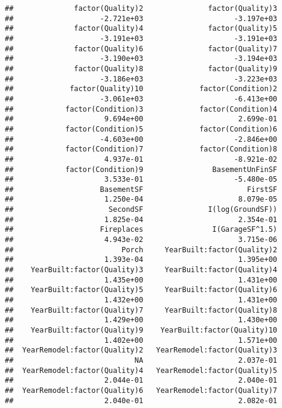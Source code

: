 \documentclass[
]{article}
\begin{document}
\begin{verbatim}
##              factor(Quality)2               factor(Quality)3  
##                    -2.721e+03                     -3.197e+03  
##              factor(Quality)4               factor(Quality)5  
##                    -3.191e+03                     -3.191e+03  
##              factor(Quality)6               factor(Quality)7  
##                    -3.190e+03                     -3.194e+03  
##              factor(Quality)8               factor(Quality)9  
##                    -3.186e+03                     -3.223e+03  
##             factor(Quality)10             factor(Condition)2  
##                    -3.061e+03                     -6.413e+00  
##            factor(Condition)3             factor(Condition)4  
##                     9.694e+00                      2.699e-01  
##            factor(Condition)5             factor(Condition)6  
##                    -4.603e+00                     -2.846e+00  
##            factor(Condition)7             factor(Condition)8  
##                     4.937e-01                     -8.921e-02  
##            factor(Condition)9                BasementUnFinSF  
##                     3.533e-01                     -5.480e-05  
##                    BasementSF                        FirstSF  
##                     1.250e-04                      8.079e-05  
##                      SecondSF               I(log(GroundSF))  
##                     1.825e-04                      2.354e-01  
##                    Fireplaces                I(GarageSF^1.5)  
##                     4.943e-02                      3.715e-06  
##                         Porch     YearBuilt:factor(Quality)2  
##                     1.393e-04                      1.395e+00  
##    YearBuilt:factor(Quality)3     YearBuilt:factor(Quality)4  
##                     1.435e+00                      1.431e+00  
##    YearBuilt:factor(Quality)5     YearBuilt:factor(Quality)6  
##                     1.432e+00                      1.431e+00  
##    YearBuilt:factor(Quality)7     YearBuilt:factor(Quality)8  
##                     1.429e+00                      1.430e+00  
##    YearBuilt:factor(Quality)9    YearBuilt:factor(Quality)10  
##                     1.402e+00                      1.571e+00  
##  YearRemodel:factor(Quality)2   YearRemodel:factor(Quality)3  
##                            NA                      2.037e-01  
##  YearRemodel:factor(Quality)4   YearRemodel:factor(Quality)5  
##                     2.044e-01                      2.040e-01  
##  YearRemodel:factor(Quality)6   YearRemodel:factor(Quality)7  
##                     2.040e-01                      2.082e-01  

\end{verbatim}
\end{document}

